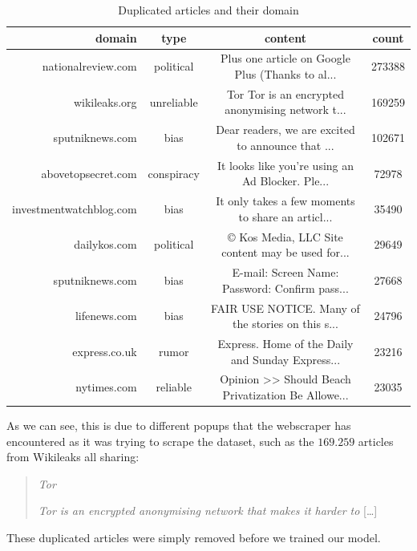 \begin{table}[htpb]
  \centering
  \caption{Duplicated articles and their domain}
  \label{tab:dupart}
  \begin{tabular}{r | c | c| c}
    domain & type & content & count \\ \hline
    nationalreview.com & political & Plus one article on Google Plus (Thanks to al... & 273388 \\ \hline
    wikileaks.org & unreliable & Tor Tor is an encrypted anonymising network t... & 169259 \\ \hline
    sputniknews.com & bias & Dear readers, we are excited to announce that ... & 102671 \\ \hline
    abovetopsecret.com & conspiracy & It looks like you're using an Ad Blocker. Ple... & 72978 \\ \hline
    investmentwatchblog.com & bias & It only takes a few moments to share an articl... & 35490 \\ \hline
    dailykos.com & political & © Kos Media, LLC Site content may be used for... & 29649 \\ \hline
    sputniknews.com & bias & E-mail: Screen Name: Password: Confirm pass... & 27668 \\ \hline
    lifenews.com & bias & FAIR USE NOTICE. Many of the stories on this s... & 24796 \\ \hline
    express.co.uk & rumor & Express. Home of the Daily and Sunday Express... & 23216 \\ \hline
    nytimes.com & reliable & Opinion >> Should Beach Privatization Be Allowe... & 23035
  \end{tabular}
\end{table}
As we can see, this is due to different popups that the webscraper has encountered as it
was trying to scrape the dataset, such as the $ 169.259 $ articles from Wikileaks all sharing:
\begin{quote}
    \textit{Tor}

    \textit{Tor is an encrypted anonymising network that makes it harder to} [\dots]\\

\end{quote}
These duplicated articles were simply removed before we trained our model.

